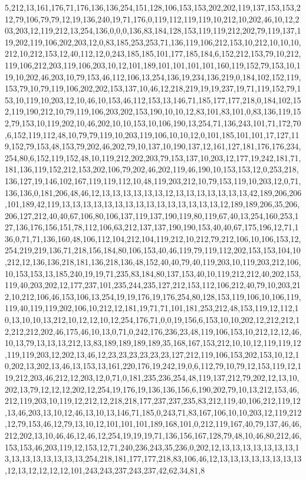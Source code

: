 5,212,13,161,176,71,176,136,136,254,151,128,106,153,153,202,202,119,137,153,153,212,79,106,79,79,12,19,136,240,19,71,176,0,119,112,119,119,10,212,10,202,46,10,12,203,203,12,119,212,13,254,136,0,0,0,136,83,184,128,153,119,119,212,202,79,119,137,119,202,119,106,202,203,12,0,83,185,253,253,71,136,119,106,212,153,10,212,10,10,10,212,10,212,153,12,40,112,12,0,243,185,185,101,177,185,184,6,152,212,153,79,10,212,119,106,212,203,119,106,203,10,12,101,189,101,101,101,101,160,119,152,79,153,10,119,10,202,46,203,10,79,153,46,112,106,13,254,136,19,234,136,219,0,184,102,152,119,153,79,10,79,119,106,202,202,153,137,10,46,12,218,219,19,19,237,19,71,119,152,79,153,10,119,10,203,12,10,46,10,153,46,112,153,13,146,71,185,177,177,218,0,184,102,152,119,190,212,10,79,119,106,203,202,153,190,10,10,12,83,101,83,101,0,83,136,119,152,79,153,10,119,202,10,46,202,10,10,153,10,106,190,13,254,71,136,243,101,71,172,70,6,152,119,112,48,10,79,79,119,10,203,119,106,10,10,12,0,101,185,101,101,17,127,119,152,79,153,48,153,79,202,46,202,79,10,137,10,190,137,12,161,127,181,176,176,234,254,80,6,152,119,152,48,10,119,212,202,203,79,153,137,10,203,12,177,19,242,181,71,181,136,119,152,212,153,202,106,79,202,46,202,119,46,190,10,153,153,12,0,253,218,136,127,19,146,102,167,119,119,112,10,48,119,203,212,10,79,153,119,10,203,12,0,71,136,136,0,181,206,48,46,12,13,13,13,13,13,13,12,13,13,13,13,13,13,13,42,189,206,206,101,189,42,119,13,13,13,13,13,13,13,13,13,13,13,13,13,13,13,12,189,189,206,35,206,206,127,212,40,40,67,106,80,106,137,119,137,190,119,80,119,67,40,13,254,160,253,127,136,176,156,151,78,112,106,63,212,137,137,190,190,153,40,40,67,175,196,12,71,136,0,71,71,136,160,48,106,112,104,212,104,119,212,10,212,79,212,106,10,106,153,12,254,219,219,136,71,218,156,184,80,106,153,40,46,119,79,119,112,202,153,153,104,10,212,12,136,136,218,181,136,218,136,48,152,40,40,79,40,119,203,10,119,203,212,106,10,153,153,13,185,240,19,19,71,235,83,184,80,137,153,40,10,119,212,212,40,202,153,119,40,203,202,12,177,237,101,235,244,235,127,212,153,112,106,212,40,79,10,203,212,10,212,106,46,153,106,13,254,19,19,176,19,176,254,80,128,153,119,106,10,106,119,119,40,119,119,202,106,10,212,12,181,19,71,71,101,181,253,212,48,153,119,12,112,10,13,10,10,13,212,10,12,12,10,12,254,176,71,0,0,19,156,6,153,10,10,202,12,212,212,12,212,212,202,46,175,46,10,13,0,71,0,242,176,236,23,48,119,106,153,10,212,12,12,46,10,13,79,13,13,13,212,13,83,189,189,189,189,35,168,167,153,212,10,10,12,119,119,12,119,119,203,12,202,13,46,12,23,23,23,23,23,23,127,212,119,106,153,202,153,10,12,10,202,13,202,13,46,13,153,13,161,220,176,19,242,19,0,6,112,79,10,79,12,153,119,12,119,212,203,46,212,12,203,12,0,71,0,181,235,236,254,48,119,137,212,79,202,12,13,10,202,13,79,12,12,12,202,12,254,19,176,19,136,136,156,6,190,202,79,10,13,212,153,46,212,119,203,10,119,12,212,12,218,218,177,237,237,235,83,212,119,40,106,212,119,12,13,46,203,13,10,12,46,13,10,13,146,71,185,0,243,71,83,167,106,10,10,203,12,119,212,12,79,153,46,12,79,13,10,12,101,101,101,189,168,101,0,212,119,167,40,79,137,46,46,212,202,13,10,46,46,12,46,12,254,19,19,19,71,136,156,167,128,79,48,10,46,80,212,46,153,153,46,203,119,12,153,12,71,240,236,243,35,236,0,202,12,13,13,13,13,13,13,13,13,13,13,13,13,13,13,13,254,218,181,177,177,218,83,106,46,12,13,13,13,13,13,13,13,13,12,13,12,12,12,12,101,243,243,237,243,237,42,62,34,81,8